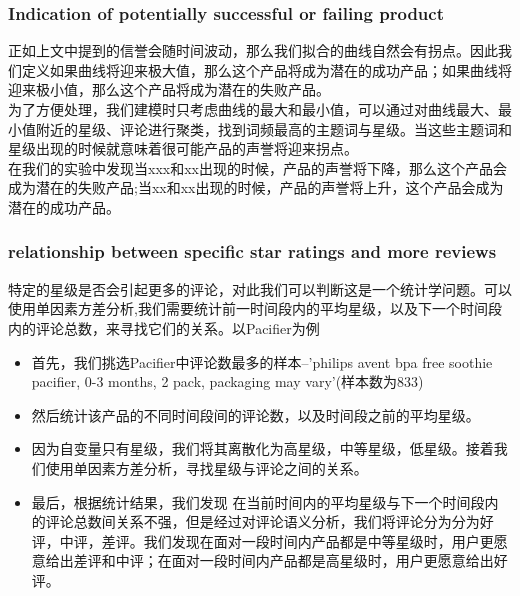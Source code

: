 \documentclass{mcmthesis}
\begin{document}
\subsubsection{Indication of potentially successful or failing product}
正如上文中提到的信誉会随时间波动，那么我们拟合的曲线自然会有拐点。因此我们定义如果曲线将迎来极大值，那么这个产品将成为潜在的成功产品；如果曲线将迎来极小值，那么这个产品将成为潜在的失败产品。\\

为了方便处理，我们建模时只考虑曲线的最大和最小值，可以通过对曲线最大、最小值附近的星级、评论进行聚类，找到词频最高的主题词与星级。当这些主题词和星级出现的时候就意味着很可能产品的声誉将迎来拐点。\\

在我们的实验中发现当xxx和xx出现的时候，产品的声誉将下降，那么这个产品会成为潜在的失败产品;当xx和xx出现的时候，产品的声誉将上升，这个产品会成为潜在的成功产品。

\subsubsection{relationship between specific star ratings and more reviews}
特定的星级是否会引起更多的评论，对此我们可以判断这是一个统计学问题。可以使用单因素方差分析,我们需要统计前一时间段内的平均星级，以及下一个时间段内的评论总数，来寻找它们的关系。以Pacifier为例
\begin{itemize}
	\item 首先，我们挑选Pacifier中评论数最多的样本--'philips avent bpa free soothie pacifier, 0-3 months, 2 pack, packaging may vary'(样本数为833)
	\item 然后统计该产品的不同时间段间的评论数，以及时间段之前的平均星级。
	\item 因为自变量只有星级，我们将其离散化为高星级，中等星级，低星级。接着我们使用单因素方差分析，寻找星级与评论之间的关系。
	\item 最后，根据统计结果，我们发现
	在当前时间内的平均星级与下一个时间段内的评论总数间关系不强，但是经过对评论语义分析，我们将评论分为分为好评，中评，差评。我们发现在面对一段时间内产品都是中等星级时，用户更愿意给出差评和中评；在面对一段时间内产品都是高星级时，用户更愿意给出好评。	
\end{itemize}
\end{document}
